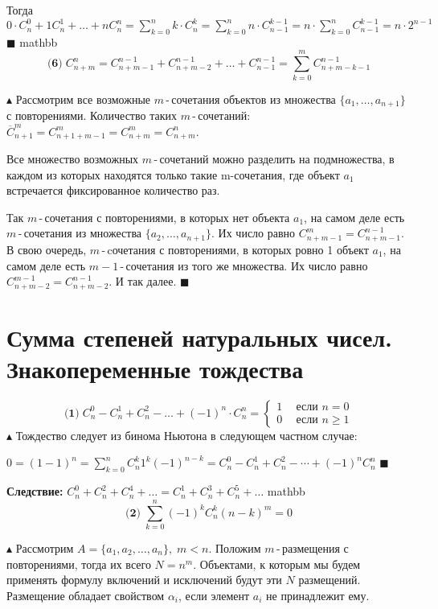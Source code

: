 Тогда  $0\cdot C_n^0 + 1C_n^1 + \ldots + nC_n^n = \sum_{k=0}^nk\cdot C_n^k = \sum_{k=0}^nn\cdot C_{n-1}^{k-1} = n\cdot\sum_{k=0}^nC_{n-1}^{k-1} =  n\cdot2^{n-1}$ \quad $\blacksquare$
mathbb $$\textbf{(6)} \; C_{n+m}^n = C_{n+m-1}^{n-1} + C_{n+m-2}^{n-1} + \ldots + C_{n-1}^{n-1} = \sum_{k=0}^mC_{n+m-k-1}^{n-1}$$


$\blacktriangle$ Рассмотрим все возможные $m$\,-\,сочетания объектов из множества $\{a_1,\ldots,a_{n+1}\}$ с повторениями. Количество таких $m$\,-\,сочетаний: $\overline C_{n+1}^m = C_{n+1+m-1}^{m} = C_{n+m}^{m} = C_{n+m}^{n}$. 

Все множество возможных $m$\,-\,сочетаний можно разделить на подмножества, в каждом из которых находятся только такие m-сочетания, где объект $a_1$ встречается фиксированное количество раз.


Так $m$\,-\,сочетания с повторениями, в которых нет объекта $a_1$, на самом деле есть $m$\,-\,сочетания из множества $\{a_2,\ldots,a_{n+1}\}$. Их число равно $C_{n+m-1}^m=C_{n+m-1}^{n-1}$. В свою очередь, $m$\,-\,cочетания с повторениями, в которых ровно 1 объект $a_1$, на самом деле есть $m-1$\,-\,сочетания из того же множества. Их число равно $C_{n+m-2}^{m-1}=C_{n+m-2}^{n-1}$. И так далее. \quad $\blacksquare$

\section{Сумма степеней натуральных чисел. Знакопеременные тождества }

$$\textbf{(1)} \; C_n^0 - C_n^1 + C_n^2 - \ldots + (-1)^n \cdot C_n^n = \begin{cases}
1  & \:\: \text{если } n=0\\
0  & \:\: \text{если } n\geq1
\end{cases}$$
$\blacktriangle$ Тождество следует из бинома Ньютона в следующем частном случае: 

$0 = (1-1)^n = \sum_{k=0}^n C_n^k 1^k (-1)^{n-k} = C_n^0 - C_n^1 + C_n^2 - \dotsb + (-1)^n C_n^n$  $\blacksquare$

\textbf{Следствие:} $C_n^0 + C_n^2 + C_n^4 + \ldots = C_n^1 + C_n^3 + C_n^5 + \ldots$
mathbb $$\textbf{(2)} \; \sum_{k=0}^n(-1)^kC_n^k(n-k)^m = 0$$


$\blacktriangle$ Рассмотрим $A = \{a_1, a_2, \ldots, a_n\}, \; m<n$. Положим $m$\,-\,размещения с повторениями, тогда их всего $N=n^m$. Объектами, к которым мы будем применять формулу включений и исключений будут эти $N$ размещений. Размещение обладает свойством $\alpha_i$, если элемент $a_i$ не принадлежит ему. 

